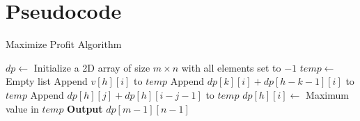 \documentclass{article}
\begin{document}
\section{Pseudocode}
\begin{algorithm}
\caption{Maximize Profit Algorithm}\label{maximize_profit}
\begin{algorithmic}[1]
 
    \State $dp \gets$ Initialize a 2D array of size $m \times n$ with all elements set to $-1$
            \State $temp \gets$ Empty list
            \State Append $v[h][i]$ to $temp$
                \State Append $dp[k][i] + dp[h-k-1][i]$ to $temp$
            \EndFor
                \State Append $dp[h][j] + dp[h][i-j-1]$ to $temp$
            \EndFor
            \State $dp[h][i] \gets$ Maximum value in $temp$
        \EndFor
    \EndFor
    \State \textbf{Output} $dp[m-1][n-1]$
\EndProcedure
\end{algorithmic}
\end{algorithm}
\end{document}
